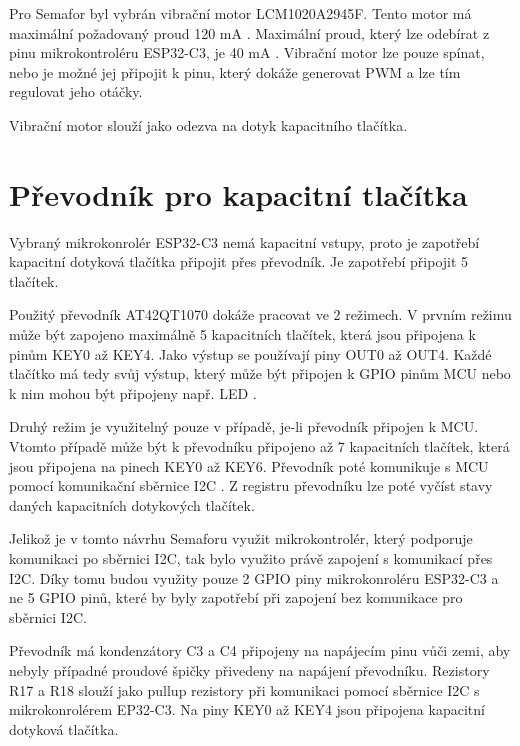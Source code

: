 Pro Semafor byl vybrán vibrační motor LCM1020A2945F. Tento motor má maximální požadovaný proud 120 mA \cite{vib_motor_dtsh}. Maximální proud, 
který lze odebírat z pinu mikrokontroléru ESP32-C3, je 40 mA \cite{ESP_C3_dtsh}. Vibrační motor lze pouze spínat, nebo je možné jej připojit 
k pinu, který dokáže generovat PWM a lze tím regulovat jeho otáčky. 

Vibrační motor slouží jako odezva na dotyk kapacitního tlačítka. 


\section{Převodník pro kapacitní tlačítka}
Vybraný mikrokonrolér ESP32-C3 nemá kapacitní vstupy, proto je zapotřebí kapacitní dotyková tlačítka připojit přes převodník. Je zapotřebí připojit 
5 tlačítek. 

Použitý převodník AT42QT1070 dokáže pracovat ve 2 režimech. V prvním režimu může být zapojeno maximálně 5 kapacitních tlačítek, která jsou připojena
k pinům KEY0 až KEY4. Jako výstup se používají piny OUT0 až OUT4. Každé tlačítko má tedy svůj výstup, který může být připojen k GPIO pinům MCU 
nebo k nim mohou být připojeny např. LED \cite{conv_cap_but_AT42QT1070_dtsh}. 

Druhý režim je využitelný pouze v případě, je-li převodník připojen k MCU. Vtomto případě může být k převodníku připojeno až 7 kapacitních tlačítek, 
která jsou připojena na pinech KEY0 až KEY6. Převodník poté komunikuje s MCU pomocí komunikační sběrnice I2C \cite{conv_cap_but_AT42QT1070_dtsh}. 
Z registru převodníku lze poté vyčíst stavy daných kapacitních dotykových tlačítek. 

Jelikož je v tomto návrhu Semaforu využit mikrokontrolér, který podporuje komunikaci po sběrnici I2C, tak bylo využito právě zapojení s komunikací 
přes I2C. Díky tomu budou využity pouze 2 GPIO piny mikrokonroléru ESP32-C3 a ne 5 GPIO pinů, které by byly zapotřebí při zapojení bez komunikace pro
sběrnici I2C.

Převodník má kondenzátory C3 a C4 připojeny na napájecím pinu vůči zemi, aby nebyly případné proudové špičky přivedeny na napájení převodníku. Rezistory
R17 a R18 slouží jako pullup rezistory při komunikaci pomocí sběrnice I2C s mikrokonrolérem EP32-C3. Na piny KEY0 až KEY4 jsou připojena kapacitní 
dotyková tlačítka.  

